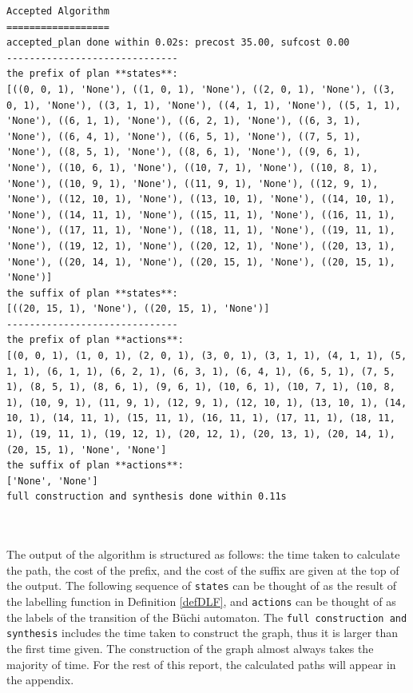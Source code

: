 \begin{minipage}{\textwidth}
\begingroup
\fontsize{9pt}{12pt}\selectfont
\begin{lstlisting}
Accepted Algorithm
==================
accepted_plan done within 0.02s: precost 35.00, sufcost 0.00
------------------------------
the prefix of plan **states**:
[((0, 0, 1), 'None'), ((1, 0, 1), 'None'), ((2, 0, 1), 'None'), ((3, 0, 1), 'None'), ((3, 1, 1), 'None'), ((4, 1, 1), 'None'), ((5, 1, 1), 'None'), ((6, 1, 1), 'None'), ((6, 2, 1), 'None'), ((6, 3, 1), 'None'), ((6, 4, 1), 'None'), ((6, 5, 1), 'None'), ((7, 5, 1), 'None'), ((8, 5, 1), 'None'), ((8, 6, 1), 'None'), ((9, 6, 1), 'None'), ((10, 6, 1), 'None'), ((10, 7, 1), 'None'), ((10, 8, 1), 'None'), ((10, 9, 1), 'None'), ((11, 9, 1), 'None'), ((12, 9, 1), 'None'), ((12, 10, 1), 'None'), ((13, 10, 1), 'None'), ((14, 10, 1), 'None'), ((14, 11, 1), 'None'), ((15, 11, 1), 'None'), ((16, 11, 1), 'None'), ((17, 11, 1), 'None'), ((18, 11, 1), 'None'), ((19, 11, 1), 'None'), ((19, 12, 1), 'None'), ((20, 12, 1), 'None'), ((20, 13, 1), 'None'), ((20, 14, 1), 'None'), ((20, 15, 1), 'None'), ((20, 15, 1), 'None')]
the suffix of plan **states**:
[((20, 15, 1), 'None'), ((20, 15, 1), 'None')]
------------------------------
the prefix of plan **actions**:
[(0, 0, 1), (1, 0, 1), (2, 0, 1), (3, 0, 1), (3, 1, 1), (4, 1, 1), (5, 1, 1), (6, 1, 1), (6, 2, 1), (6, 3, 1), (6, 4, 1), (6, 5, 1), (7, 5, 1), (8, 5, 1), (8, 6, 1), (9, 6, 1), (10, 6, 1), (10, 7, 1), (10, 8, 1), (10, 9, 1), (11, 9, 1), (12, 9, 1), (12, 10, 1), (13, 10, 1), (14, 10, 1), (14, 11, 1), (15, 11, 1), (16, 11, 1), (17, 11, 1), (18, 11, 1), (19, 11, 1), (19, 12, 1), (20, 12, 1), (20, 13, 1), (20, 14, 1), (20, 15, 1), 'None', 'None']
the suffix of plan **actions**:
['None', 'None']
full construction and synthesis done within 0.11s
\end{lstlisting}
\endgroup
\end{minipage} \\ \\


The output of the algorithm is structured as follows: the time taken to calculate the path, the cost of the prefix, and the cost of the suffix are given at the top of the output. The following sequence of \texttt{states} can be thought of as the result of the labelling function in Definition \ref{defDLF}, and \texttt{actions} can be thought of as the labels of the transition of the B\"uchi automaton. The \texttt{full construction and synthesis} includes the time taken to construct the graph, thus it is larger than the first time given. The construction of the graph almost always takes the majority of time. For the rest of this report, the calculated paths will appear in the appendix.%

